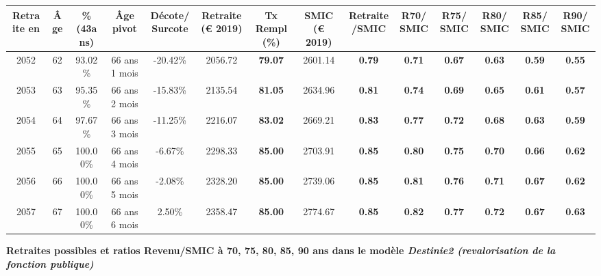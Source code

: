 \begin{adjustbox}{max width=\textwidth} 
\begin{tabular}[htb]{|c|c||c|c|c||c|c||c|c||c|c|c|c|c|} 
\hline 
 Retraite en &  Âge &  \%(43ans) &  Âge pivot &  Décote/Surcote &  Retraite (\euro{} 2019) &  Tx Rempl(\%) &  SMIC (\euro{} 2019) &  Retraite/SMIC &  R70/SMIC &  R75/SMIC &  R80/SMIC &  R85/SMIC &  R90/SMIC \\ 
\hline \hline 
 2052 &  62 &  93.02\% &  66 ans 1 mois &  -20.42\% &  2056.72 &  {\bf 79.07} &  2601.14 &  {\bf {\color{red} 0.79}} &  {\bf {\color{red} 0.71}} &  {\bf {\color{red} 0.67}} &  {\bf {\color{red} 0.63}} &  {\bf {\color{red} 0.59}} &  {\bf {\color{red} 0.55}} \\ 
\hline 
 2053 &  63 &  95.35\% &  66 ans 2 mois &  -15.83\% &  2135.54 &  {\bf 81.05} &  2634.96 &  {\bf {\color{red} 0.81}} &  {\bf {\color{red} 0.74}} &  {\bf {\color{red} 0.69}} &  {\bf {\color{red} 0.65}} &  {\bf {\color{red} 0.61}} &  {\bf {\color{red} 0.57}} \\ 
\hline 
 2054 &  64 &  97.67\% &  66 ans 3 mois &  -11.25\% &  2216.07 &  {\bf 83.02} &  2669.21 &  {\bf {\color{red} 0.83}} &  {\bf {\color{red} 0.77}} &  {\bf {\color{red} 0.72}} &  {\bf {\color{red} 0.68}} &  {\bf {\color{red} 0.63}} &  {\bf {\color{red} 0.59}} \\ 
\hline 
 2055 &  65 &  100.00\% &  66 ans 4 mois &  -6.67\% &  2298.33 &  {\bf 85.00} &  2703.91 &  {\bf {\color{red} 0.85}} &  {\bf {\color{red} 0.80}} &  {\bf {\color{red} 0.75}} &  {\bf {\color{red} 0.70}} &  {\bf {\color{red} 0.66}} &  {\bf {\color{red} 0.62}} \\ 
\hline 
 2056 &  66 &  100.00\% &  66 ans 5 mois &  -2.08\% &  2328.20 &  {\bf 85.00} &  2739.06 &  {\bf {\color{red} 0.85}} &  {\bf {\color{red} 0.81}} &  {\bf {\color{red} 0.76}} &  {\bf {\color{red} 0.71}} &  {\bf {\color{red} 0.67}} &  {\bf {\color{red} 0.62}} \\ 
\hline 
 2057 &  67 &  100.00\% &  66 ans 6 mois &  2.50\% &  2358.47 &  {\bf 85.00} &  2774.67 &  {\bf {\color{red} 0.85}} &  {\bf {\color{red} 0.82}} &  {\bf {\color{red} 0.77}} &  {\bf {\color{red} 0.72}} &  {\bf {\color{red} 0.67}} &  {\bf {\color{red} 0.63}} \\ 
\hline 
\hline 
\end{tabular} 
\end{adjustbox} 
 
 \vspace{0.1cm} 
{\bf \noindent Retraites possibles et ratios Revenu/SMIC à 70, 75, 80, 85, 90 ans dans le modèle \emph{Destinie2 (revalorisation de la fonction publique)}}  
 
